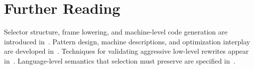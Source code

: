 \section{Further Reading}\label{sec:ch25-reading}

Selector structure, frame lowering, and machine-level code generation are introduced in~\cite{appel-1998-modern}.
Pattern design, machine descriptions, and optimization interplay are developed in~\cite{morgan-1998-optimizing}.
Techniques for validating aggressive low-level rewrites appear in~\cite{safonov-2010-trustworthy}.
Language-level semantics that selection must preserve are specified in~\cite{wg14-2011-c11}.
